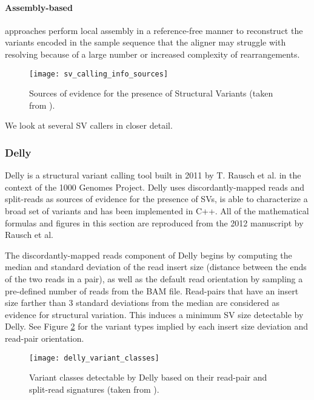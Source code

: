 \paragraph{Assembly-based} approaches perform local assembly in a reference-free manner to reconstruct the variants encoded in the sample sequence that the aligner may struggle with resolving because of a large number or increased complexity of rearrangements.

\begin{figure}[H]
    \texttt{[image: sv\_calling\_info\_sources]}
    \centering
    \caption {Sources of evidence for the presence of Structural Variants (taken from \autocite{zhao2013computational}).}
    \label{fig:sv_calling_info_sources}
\end{figure}

We look at several SV callers in closer detail.

\subsubsection{Delly}

Delly\autocite{rausch2012delly} is a structural variant calling tool built in 2011 by T. Rausch et al. in the context of the 1000 Genomes Project. Delly uses discordantly-mapped reads and split-reads as sources of evidence for the presence of SVs, is able to characterize a broad set of variants and has been implemented in C++. All of the mathematical formulas and figures in this section are reproduced from the 2012 manuscript by Rausch et al.

The discordantly-mapped reads component of Delly begins by computing the median and standard deviation of the read insert size (distance between the ends of the two reads in a pair), as well as the default read orientation by sampling a pre-defined number of reads from the BAM file. Read-pairs that have an insert size farther than 3 standard deviations from the median are considered as evidence for structural variation. This induces a minimum SV size detectable by Delly. See Figure \ref{fig:delly_variant_classes} for the variant types implied by each insert size deviation and read-pair orientation.

\begin{figure}[H]
    \texttt{[image: delly\_variant\_classes]}
    \centering
    \caption {Variant classes detectable by Delly based on their read-pair and split-read signatures (taken from \autocite{rausch2012delly}).}
    \label{fig:delly_variant_classes}
\end{figure}

